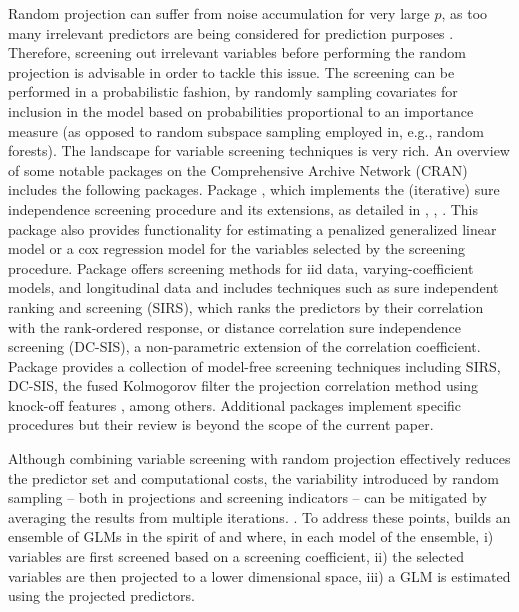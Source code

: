 \documentclass[
  article]{jss}
\begin{document}
Random projection can suffer from noise accumulation for very large
\(p\), as too many irrelevant predictors are being considered for
prediction purposes \citep{Dunson2020TargRandProj}. Therefore, screening
out irrelevant variables before performing the random projection is
advisable in order to tackle this issue. The screening can be performed
in a probabilistic fashion, by randomly sampling covariates for
inclusion in the model based on probabilities proportional to an
importance measure (as opposed to random subspace sampling employed in,
e.g., random forests). The  landscape for variable screening
techniques is very rich. An overview of some notable packages on the
Comprehensive  Archive Network (CRAN) includes the following
packages. Package  \citep{SISR}, which implements the
(iterative) sure independence screening procedure and its extensions, as
detailed in \citet{Fan2007SISforUHD}, \citet{Fan2010sisglms},
\citet{fan2010high}. This package also provides functionality for
estimating a penalized generalized linear model or a cox regression
model for the variables selected by the screening procedure. Package
 \citep{pkg:VariableScreening} offers screening
methods for iid data, varying-coefficient models, and longitudinal data
and includes techniques such as sure independent ranking and screening
(SIRS), which ranks the predictors by their correlation with the
rank-ordered response, or distance correlation sure independence
screening (DC-SIS), a non-parametric extension of the correlation
coefficient. Package  \citep{pkg:MFSIS} provides a collection
of model-free screening techniques including SIRS, DC-SIS, the fused
Kolmogorov filter \citep{mai2015fusedkolmogorov} the projection
correlation method using knock-off features \citep{liu2020knockoff},
among others. Additional packages implement specific procedures but
their review is beyond the scope of the current paper.

Although combining variable screening with random projection effectively
reduces the predictor set and computational costs, the variability
introduced by random sampling -- both in projections and screening
indicators -- can be mitigated by averaging the results from multiple
iterations. \citep{Thanei2017RPforHDR}. To address these points,
 builds an ensemble of GLMs in the spirit of
\citet{Dunson2020TargRandProj} and \citet{parzer2024glms} where, in each
model of the ensemble, i) variables are first screened based on a
screening coefficient, ii) the selected variables are then projected to
a lower dimensional space, iii) a GLM is estimated using the projected
predictors.
\end{document}
